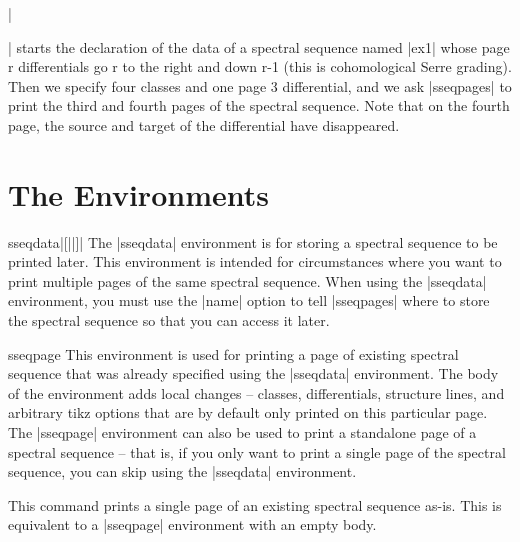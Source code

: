 \documentclass{ltxdoc}
\begin{document}
|\begin{sseqdata}[name=ex1,degree={#1}{1-#1}]| starts the declaration of the data of a spectral sequence named |ex1| whose page r differentials go r to the right and down r-1 (this is cohomological Serre grading). Then we specify four classes and one page 3 differential, and we ask |sseqpages| to print the third and fourth pages of the spectral sequence. Note that on the fourth page, the source and target of the differential have disappeared.

\section{The Environments}
\begin{environment}{{sseqdata}|[||]|}
The |sseqdata| environment is for storing a spectral sequence to be printed later. This environment is intended for circumstances where you want to print multiple pages of the same spectral sequence. When using the |sseqdata| environment, you must use the |name| option to tell |sseqpages| where to store the spectral sequence so that you can access it later.
\end{environment}

\begin{environment}{{sseqpage}}
This environment is used for printing a page of existing spectral sequence that was already specified using the |sseqdata| environment. The body of the environment adds local changes -- classes, differentials, structure lines, and arbitrary tikz options that are by default only printed on this particular page. The |sseqpage| environment can also be used to print a standalone page of a spectral sequence -- that is, if you only want to print a single page of the spectral sequence, you can skip using the |sseqdata| environment.
\end{environment}

\begin{command}{}
This command prints a single page of an existing spectral sequence as-is. This is equivalent to a |sseqpage| environment with an empty body.
\end{command}



\end{sseqdata}
\end{document}
